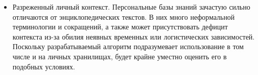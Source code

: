 \begin{itemize}
            каждая вытекает из предыдущей, проверяют
            эффективность поиска длинных логических путей.
      \item Разреженный личный контекст.
            Персональные базы знаний зачастую сильно отличаются от энциклопедических текстов.
            В них много неформальной терминологии и сокращений,
            а также может присутствовать дефицит контекста
            из-за обилия неявных временных или логистических зависимостей.
            Поскольку разрабатываемый алгоритм подразумевает использование
            в том числе и на личных хранилищах,
            будет крайне уместно оценить его в подобных условиях.
\end{itemize}
